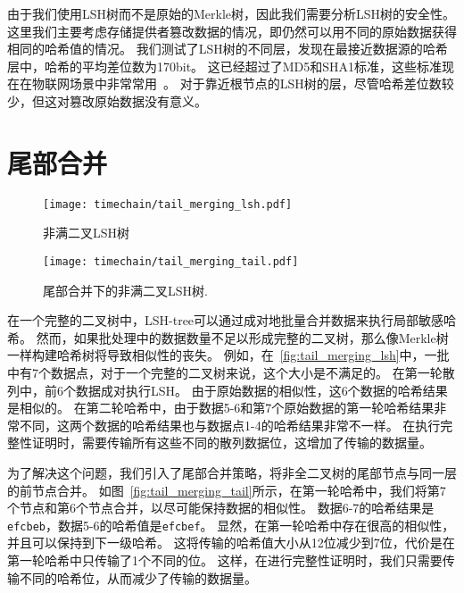 由于我们使用LSH树而不是原始的Merkle树，因此我们需要分析LSH树的安全性。
这里我们主要考虑存储提供者篡改数据的情况，即仍然可以用不同的原始数据获得相同的哈希值的情况。
我们测试了LSH树的不同层，发现在最接近数据源的哈希层中，哈希的平均差位数为170bit。
这已经超过了MD5和SHA1标准，这些标准现在在物联网场景中非常常用~\cite{chi2017hashing,landge2018secured}。
对于靠近根节点的LSH树的层，尽管哈希差位数较少，但这对篡改原始数据没有意义。

\section{尾部合并}

\begin{figure}[t]
    \centering
	\begin{minipage}{0.8\linewidth}
        \centering
        \texttt{[image: timechain/tail\_merging\_lsh.pdf]}
        \caption{非满二叉LSH树}
        \label{fig:tail_merging_lsh}
	\end{minipage}
\end{figure}

\begin{figure}[t]
    \centering
	\begin{minipage}{0.8\linewidth}
        \centering
        \texttt{[image: timechain/tail\_merging\_tail.pdf]}
	\end{minipage}
	\caption{尾部合并下的非满二叉LSH树.}
	\label{fig:tail_merging_tail}
\end{figure}

在一个完整的二叉树中，LSH-tree可以通过成对地批量合并数据来执行局部敏感哈希。
然而，如果批处理中的数据数量不足以形成完整的二叉树，那么像Merkle树一样构建哈希树将导致相似性的丧失。
例如，在~\autoref{fig:tail_merging_lsh}中，一批中有7个数据点，对于一个完整的二叉树来说，这个大小是不满足的。
在第一轮散列中，前6个数据成对执行LSH。
由于原始数据的相似性，这6个数据的哈希结果是相似的。
在第二轮哈希中，由于数据5-6和第7个原始数据的第一轮哈希结果非常不同，这两个数据的哈希结果也与数据点1-4的哈希结果非常不一样。
在执行完整性证明时，需要传输所有这些不同的散列数据位，这增加了传输的数据量。

为了解决这个问题，我们引入了尾部合并策略，将非全二叉树的尾部节点与同一层的前节点合并。
如图~\autoref{fig:tail_merging_tail}所示，在第一轮哈希中，我们将第7个节点和第6个节点合并，以尽可能保持数据的相似性。
数据6-7的哈希结果是\texttt{efcbeb}，数据5-6的哈希值是\texttt{efcbef}。
显然，在第一轮哈希中存在很高的相似性，并且可以保持到下一级哈希。
这将传输的哈希值大小从12位减少到7位，代价是在第一轮哈希中只传输了1个不同的位。
这样，在进行完整性证明时，我们只需要传输不同的哈希位，从而减少了传输的数据量。

